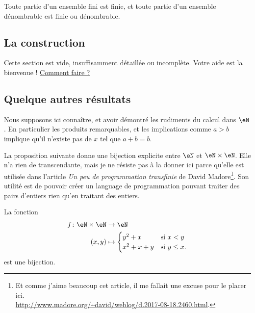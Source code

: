 \begin{proposition} \label{PropQEPoozLqOQ}
    Toute partie d'un ensemble fini est finie, et toute partie d'un ensemble dénombrable est finie ou dénombrable.
\end{proposition}

\subsection{La construction}

Cette section est vide, insuffisamment détaillée ou incomplète. Votre aide est la bienvenue ! \hyperref[SECooZDUQooVcbOSZ]{Comment faire ?}

\subsection{Quelque autres résultats}

Nous supposons ici connaître, et avoir démontré les rudiments du calcul dans \( \eN\). En particulier les produits remarquables, et les implications comme \( a>b\) implique qu'il n'existe pas de \( x\) tel que \( a+b=b\).

La proposition suivante donne une bijection explicite entre \( \eN\) et \( \eN\times \eN\). Elle n'a rien de transcendante, mais je ne résiste pas à la donner ici parce qu'elle est utilisée dans l'article \emph{Un peu de programmation transfinie} de David Madore\footnote{Et comme j'aime beaucoup cet article, il me fallait une excuse pour le placer ici.\\ \url{http://www.madore.org/~david/weblog/d.2017-08-18.2460.html}.}. Son utilité est de pouvoir créer un language de programmation pouvant traiter des pairs d'entiers rien qu'en traitant des entiers.
\begin{proposition}        \label{PROPooLPKUooAlsYJg}
    La fonction
    \begin{equation}
        \begin{aligned}
            f\colon \eN\times \eN&\to \eN \\
            (x,y)&\mapsto \begin{cases}
                y^2+x    &   \text{si } x<y\\
                x^2+x+y    &    \text{si } y\leq x.
            \end{cases}
        \end{aligned}
    \end{equation}
    est une bijection.
\end{proposition}

